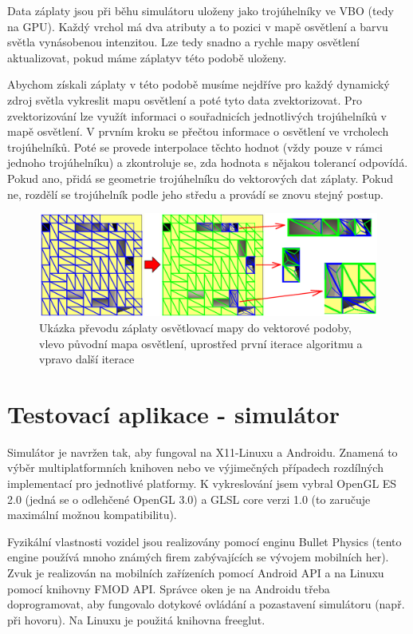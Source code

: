 \documentclass[11pt,twoside,a4paper]{book}
\begin{document}
Data záplaty jsou při běhu simulátoru uloženy jako trojúhelníky ve VBO (tedy na GPU). Každý vrchol má dva atributy a to pozici v mapě osvětlení a barvu světla vynásobenou intenzitou. Lze tedy snadno a rychle mapy osvětlení aktualizovat, pokud máme záplaty\linebreak v této podobě uloženy.

Abychom získali záplaty v této podobě musíme nejdříve pro každý dynamický zdroj světla vykreslit mapu osvětlení a poté tyto data zvektorizovat. Pro zvektorizování lze využít informaci o souřadnicích jednotlivých trojúhelníků v mapě osvětlení. V prvním kroku se přečtou informace o osvětlení ve vrcholech trojúhelníků. Poté se provede interpolace těchto hodnot (vždy pouze v rámci jednoho trojúhelníku) a zkontroluje se, zda hodnota s nějakou tolerancí odpovídá. Pokud ano, přidá se geometrie trojúhelníku do vektorových dat záplaty. Pokud ne, rozdělí se trojúhelník podle jeho středu a provádí se znovu stejný postup.
\newpage

\begin{center}
\begin{figure}[h]
\includegraphics[width=150mm]{figures/lmpatch.png}
\caption{Ukázka převodu záplaty osvětlovací mapy do vektorové podoby, vlevo původní mapa osvětlení, uprostřed první iterace algoritmu a vpravo další iterace}
\end{figure}
\end{center}

\section{Testovací aplikace - simulátor}
Simulátor je navržen tak, aby fungoval na X11-Linuxu a Androidu. Znamená to výběr multiplatformních knihoven nebo ve výjimečných případech rozdílných implementací pro jednotlivé platformy. K vykreslování jsem vybral OpenGL ES 2.0 (jedná se o odlehčené OpenGL 3.0) a GLSL core verzi 1.0 (to zaručuje maximální možnou kompatibilitu).

Fyzikální vlastnosti vozidel jsou realizovány pomocí enginu Bullet Physics (tento engine používá mnoho známých firem zabývajících se vývojem mobilních her). Zvuk je realizován na mobilních zařízeních pomocí Android API a na Linuxu pomocí knihovny FMOD API. Správce oken je na Androidu třeba doprogramovat, aby fungovalo dotykové ovládání a pozastavení simulátoru (např. při hovoru). Na Linuxu je použitá knihovna freeglut.
\end{document}
